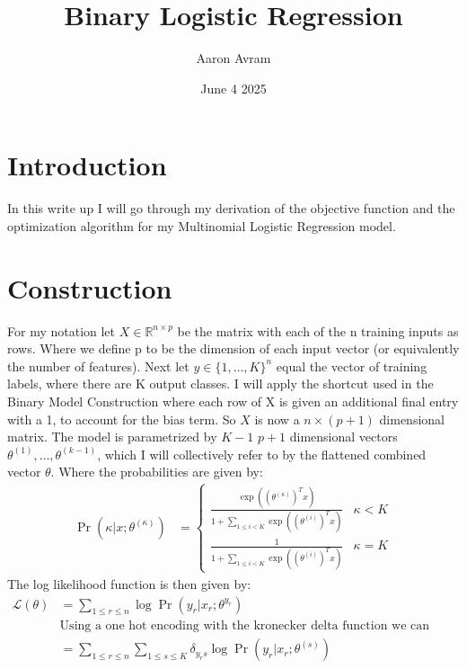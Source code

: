 \documentclass[12pt]{article}
\title{Binary Logistic Regression}
\author{Aaron Avram}
\date{June 4 2025}
\begin{document}
\maketitle

\section*{Introduction}
In this write up I will go through my derivation of the objective function and the optimization algorithm for my Multinomial
Logistic Regression model.

\section*{Construction}
For my notation let $X \in \mathbb{R}^{n \times p}$ be the matrix
with each of the n training inputs as rows. Where we define p to be the dimension
of each input vector (or equivalently the number of features). Next
let $y \in \{1, \ldots, K \}^n$ equal the vector of training labels, where there are K
output classes. I will apply the shortcut used in the Binary Model Construction
where each row of X is given an additional final entry with a 1, to account for the bias term. So $X$
is now a $n \times (p+1)$ dimensional matrix. The model is parametrized by $K - 1$
$p + 1$ dimensional vectors $\theta^{(1)}, \ldots, \theta^{(k-1)}$, which I will collectively refer to by the
flattened combined vector $\theta$. Where the probabilities
are given by:
\begin{align*}
    \Pr(\kappa | x; \theta^{(\kappa)}) &= \begin{cases}
        \frac{\exp((\theta^{(\kappa)})^Tx)}{1 + \displaystyle \sum_{1 \leq i < K}\exp((\theta^{(i)})^Tx)} & \kappa < K \\
        \frac{1}{1 + \displaystyle \sum_{1 \leq i < K}\exp((\theta^{(i)})^Tx)} & \kappa = K
    \end{cases}
\end{align*}
The log likelihood function is then given by:
\begin{align*}
    \mathcal{L}(\theta) &= \displaystyle \sum_{1 \leq r \leq n}\log\Pr(y_r | x_r; \theta^{y_r}) \\
    &\text{Using a one hot encoding with the kronecker delta function we can write this as: } \\
    &= \displaystyle \sum_{1 \leq r \leq n} \sum_{1 \leq s \leq K}\delta_{y_rs}\log\Pr(y_r | x_r; \theta^{(s)}) \\
\end{align*}
\end{document}

